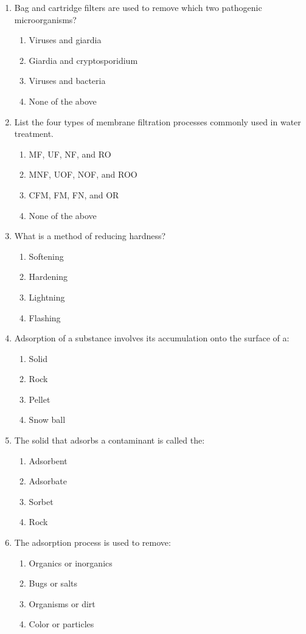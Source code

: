 \begin{enumerate}
\item Bag and cartridge filters are used to remove which two pathogenic microorganisms?
\begin{enumerate}
\item Viruses and giardia
\item Giardia and cryptosporidium
\item Viruses and bacteria
\item None of the above
\end{enumerate}

\item List the four types of membrane filtration processes commonly used in water
treatment.
\begin{enumerate}
\item MF, UF, NF, and RO
\item MNF, UOF, NOF, and ROO
\item CFM, FM, FN, and OR
\item None of the above
\end{enumerate}

\item What is a method of reducing hardness?
\begin{enumerate}
\item Softening
\item Hardening
\item Lightning
\item Flashing
\end{enumerate}

\item Adsorption of a substance involves its accumulation onto the surface of a:
\begin{enumerate}
\item Solid
\item Rock
\item Pellet
\item Snow ball
\end{enumerate}

\item The solid that adsorbs a contaminant is called the:
\begin{enumerate}
\item Adsorbent
\item Adsorbate
\item Sorbet
\item Rock
\end{enumerate}

\item The adsorption process is used to remove:
\begin{enumerate}
\item Organics or inorganics
\item Bugs or salts
\item Organisms or dirt
\item Color or particles
\end{enumerate}


\end{enumerate}

